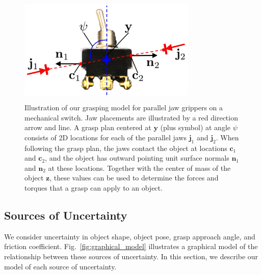\documentclass[10pt, conference]{ieeeconf}      %
\newcommand{\bc}{\mathbf{c}}
\newcommand{\bj}{\mathbf{j}}
\newcommand{\bn}{\mathbf{n}}
\newcommand{\by}{\mathbf{y}}
\newcommand{\bz}{\mathbf{z}}
\begin{document}
\begin{figure}[t!]
\centering
\includegraphics[width = 8.5cm, height = 5.25cm]{figures/bandit_grasp_model.jpg}
\caption{Illustration of our grasping model for parallel jaw grippers on a mechanical switch. Jaw placements are illustrated by a red direction arrow and line. A grasp plan centered at $\by$ (plus symbol) at angle $\psi$ consists of 2D locations for each of the parallel jaws $\bj_1$ and $\bj_2$. When following the grasp plan, the jaws contact the object at locations $\bc_1$ and $\bc_2$, and the object has outward pointing unit surface normals $\bn_1$ and $\bn_2$ at these locations. Together with the center of mass of the object $\bz$, these values can be used to determine the forces and torques that a grasp can apply to an object.}
\vspace*{-2ex}
\label{fig:grasp_model}
\end{figure}

\subsection{Sources of Uncertainty}
We consider uncertainty in object shape, object pose, grasp approach angle, and friction coefficient.
Fig.~\ref{fig:graphical_model} illustrates a graphical model of the relationship between these sources of uncertainty.
In this section, we describe our model of each source of uncertainty.
\end{document}

